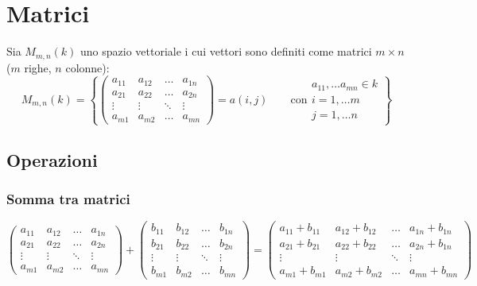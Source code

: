 \documentclass[a4paper]{article}
\begin{document}
\newpage


\section{Matrici}
Sia \(M_{m,n}(k)\) uno spazio vettoriale i cui vettori sono definiti come matrici \(m \times n\) (\(m\) righe, \(n\) colonne):
\[M_{m,n}(k) = \left\{ \begin{pmatrix}
	a_{11} & a_{12} & \dots & a_{1n} \\
	a_{21} & a_{22} & \dots & a_{2n} \\
	\vdots & \vdots & \ddots & \vdots \\
	a_{m1} & a_{m2} & \dots & a_{mn}
\end{pmatrix} = a(i,j) \qquad \text{con} \begin{matrix}
	a_{11}, \dots a_{mn} \in k \\
	i = 1,\dots m \\
	j = 1,\dots n	
\end{matrix} \right\}\]

\subsection{Operazioni}
\subsubsection*{Somma tra matrici}
\[\begin{pmatrix}
	a_{11} & a_{12} & \dots & a_{1n} \\
	a_{21} & a_{22} & \dots & a_{2n} \\
	\vdots & \vdots & \ddots & \vdots \\
	a_{m1} & a_{m2} & \dots & a_{mn}
\end{pmatrix} + 
\begin{pmatrix}
	b_{11} & b_{12} & \dots & b_{1n} \\
	b_{21} & b_{22} & \dots & b_{2n} \\
	\vdots & \vdots & \ddots & \vdots \\
	b_{m1} & b_{m2} & \dots & b_{mn}
\end{pmatrix} = 
\begin{pmatrix}
	a_{11} + b_{11} & a_{12} + b_{12} & \dots & a_{1n} + b_{1n} \\
	a_{21} + b_{21} & a_{22} + b_{22} & \dots & a_{2n} + b_{1n} \\
	\vdots & \vdots & \ddots & \vdots \\
	a_{m1} + b_{m1} & a_{m2} + b_{m2} & \dots & a_{mn} + b_{mn}
\end{pmatrix}\]
\end{document}
